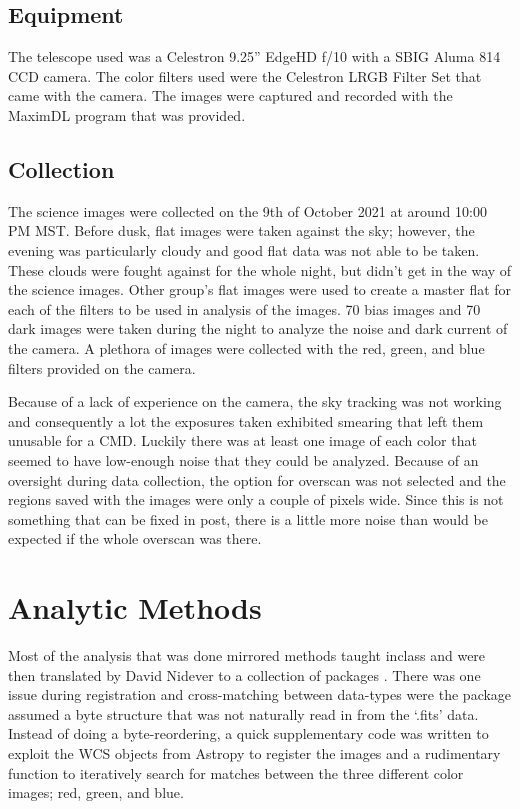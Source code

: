 \documentclass[twoside,11pt]{article}
\begin{document}
\subsection{Equipment}
The telescope used was a Celestron 9.25'' EdgeHD f/10 with a SBIG Aluma 814 CCD camera. The color filters used were the Celestron LRGB Filter Set that came with the camera. The images were captured and recorded with the MaximDL program that was provided.

\subsection{Collection}
The science images were collected on the 9th of October 2021 at around 10:00 PM MST. Before dusk, flat images were taken against the sky; however, the evening was particularly cloudy and good flat data was not able to be taken. These clouds were fought against for the whole night, but didn't get in the way of the science images. Other group's flat images were used to create a master flat for each of the filters to be used in analysis of the images. 70 bias images and 70 dark images were taken during the night to analyze the noise and dark current of the camera. A plethora of images were collected with the red, green, and blue filters provided on the camera.

Because of a lack of experience on the camera, the sky tracking was not working and consequently a lot the exposures taken exhibited smearing that left them unusable for a CMD. Luckily there was at least one image of each color that seemed to have low-enough noise that they could be analyzed. Because of an oversight during data collection, the option for overscan was not selected and the regions saved with the images were only a couple of pixels wide. Since this is not something that can be fixed in post, there is a little more noise than would be expected if the whole overscan was there. 

\section{Analytic Methods}
Most of the analysis that was done mirrored methods taught inclass and were then translated by David Nidever to a collection of packages \citep{bozepy, dlnpyutils, prometheus}. There was one issue during registration and cross-matching between data-types were the package assumed a byte structure that was not naturally read in from the `.fits' data. Instead of doing a byte-reordering, a quick supplementary code was written to exploit the WCS objects from Astropy to register the images and a rudimentary function to iteratively search for  matches between the three different color images; red, green, and blue. 
\end{document}
